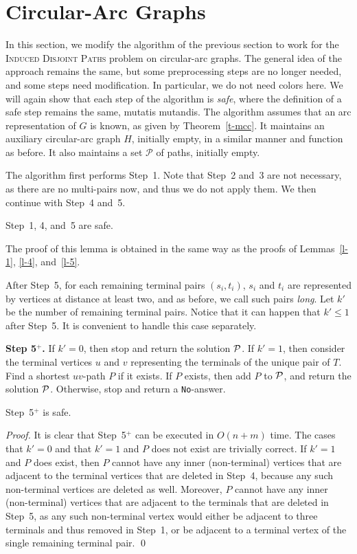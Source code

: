 \documentclass{llncs}
\newcommand{\mc}{\mathcal}
\newcommand{\problemIDP}{\textsc{Induced Disjoint Paths}}
\begin{document}
\section{Circular-Arc Graphs}\label{s-circ}
In this section, we modify the algorithm of the previous section to work for the \problemIDP{} problem on circular-arc graphs. The general idea of the approach remains the same, but some preprocessing steps are no longer needed, and some steps need modification. In particular, we do not need colors here. We will again show that each step of the algorithm is \emph{safe}, where the definition of a safe step remains the same, mutatis mutandis. The algorithm assumes that an arc representation of $G$ is known, as given by Theorem~\ref{t-mcc}. It maintains an auxiliary circular-arc graph $H$, initially empty, in a similar manner and function as before. It also maintains a set $\mc{P}$ of paths, initially empty.

The algorithm first performs Step~1. Note that Step~2 and~3 are not necessary, as there are no multi-pairs now, and thus we do not apply them. We then continue with Step~4 and~5.

\begin{lemma} \label{l-c-145}
Step~1, 4, and~5 are safe.
\end{lemma}
The proof of this lemma is obtained in the same way as the proofs of Lemmas~\ref{l-1}, \ref{l-4}, and~\ref{l-5}.

After Step~5, for each remaining terminal pairs $(s_i,t_i)$, $s_i$ and $t_i$ are represented by vertices at distance at least two, and as before, we call such pairs \emph{long}. Let $k'$ be the number of remaining terminal pairs. Notice that it can happen that $k'\leq 1$ after Step~5. It is convenient to handle this case separately.

\newcommand{\sfiv}{5$^{+}$}

\medskip
\noindent
{\bf Step \sfiv{}.} If $k'=0$, then stop and return the solution $\cal P$. If $k'=1$, then consider the terminal vertices $u$ and $v$ representing the terminals of the unique pair of $T$. Find a shortest $uv$-path $P$ if it exists. If $P$ exists, then add $P$ to $\cal P$, and return the solution $\cal P$. Otherwise, stop and return a {\tt No}-answer.

\begin{lemma}\label{l-iv}
Step~\sfiv{} is safe.
\end{lemma}

\begin{proof}
It is clear that Step~\sfiv{} can be executed in $O(n+m)$ time. The cases that $k'=0$ and that $k'=1$ and $P$ does not exist are trivially correct. If $k'=1$ and $P$ does exist, then $P$ cannot have any inner (non-terminal) vertices that are adjacent to the terminal vertices that are deleted in Step~4, because any such non-terminal vertices are deleted as well. Moreover, $P$ cannot have any inner (non-terminal) vertices that are adjacent to the terminals that are deleted in Step~5, as any such non-terminal vertex would either be adjacent to three terminals and thus removed in Step~1, or be adjacent to a terminal vertex of the single remaining terminal pair.
\qed
\end{proof}
\end{document}
